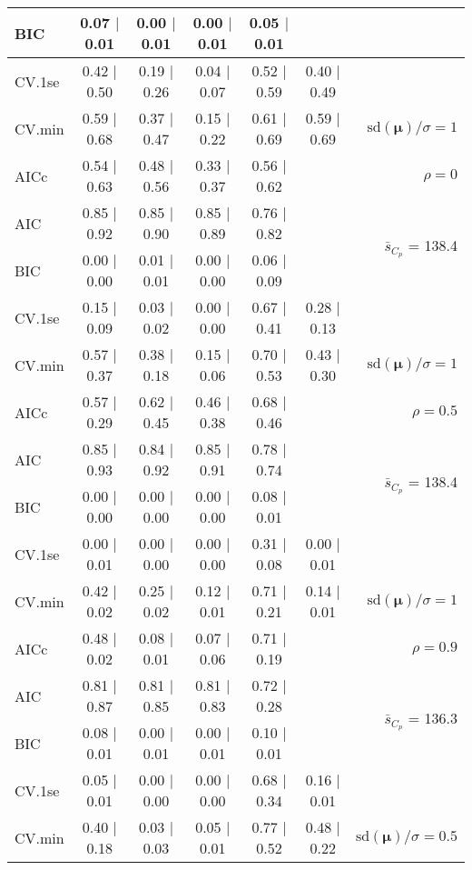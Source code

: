 \documentclass[12pt]{article}
\newcommand{\mr}[1]{\mathrm{#1}}
\newcommand{\bm}[1]{\mathbf{#1}}
\begin{document}
\begin{table}[p]
\begin{center}
\begin{tabular}{l*{5}{c}|r}
BIC & 0.07 $\mid$ 0.01 & 0.00 $\mid$ 0.01 & 0.00 $\mid$ 0.01 & 0.05 $\mid$ 0.01 & & \\
 \hline 
CV.1se & 0.42 $\mid$ 0.50 & 0.19 $\mid$ 0.26 & 0.04 $\mid$ 0.07 & 0.52 $\mid$ 0.59 & 0.40 $\mid$ 0.49 &\\
CV.min & 0.59 $\mid$ 0.68 & 0.37 $\mid$ 0.47 & 0.15 $\mid$ 0.22 & 0.61 $\mid$ 0.69 & 0.59 $\mid$ 0.69 &  $\mr{sd}(\bm{\mu})/\sigma=1$ \\
AICc & 0.54 $\mid$ 0.63 & 0.48 $\mid$ 0.56 & 0.33 $\mid$ 0.37 & 0.56 $\mid$ 0.62 & & $\rho=0$ \\
AIC & 0.85 $\mid$ 0.92 & 0.85 $\mid$ 0.90 & 0.85 $\mid$ 0.89 & 0.76 $\mid$ 0.82 & & \multirow{2}{*}{$\bar{s}_{C_p}$ = 138.4} \\
BIC & 0.00 $\mid$ 0.00 & 0.01 $\mid$ 0.01 & 0.00 $\mid$ 0.00 & 0.06 $\mid$ 0.09 & & \\
 \hline 
CV.1se & 0.15 $\mid$ 0.09 & 0.03 $\mid$ 0.02 & 0.00 $\mid$ 0.00 & 0.67 $\mid$ 0.41 & 0.28 $\mid$ 0.13 &\\
CV.min & 0.57 $\mid$ 0.37 & 0.38 $\mid$ 0.18 & 0.15 $\mid$ 0.06 & 0.70 $\mid$ 0.53 & 0.43 $\mid$ 0.30 &  $\mr{sd}(\bm{\mu})/\sigma=1$ \\
AICc & 0.57 $\mid$ 0.29 & 0.62 $\mid$ 0.45 & 0.46 $\mid$ 0.38 & 0.68 $\mid$ 0.46 & & $\rho=0.5$ \\
AIC & 0.85 $\mid$ 0.93 & 0.84 $\mid$ 0.92 & 0.85 $\mid$ 0.91 & 0.78 $\mid$ 0.74 & & \multirow{2}{*}{$\bar{s}_{C_p}$ = 138.4} \\
BIC & 0.00 $\mid$ 0.00 & 0.00 $\mid$ 0.00 & 0.00 $\mid$ 0.00 & 0.08 $\mid$ 0.01 & & \\
 \hline 
CV.1se & 0.00 $\mid$ 0.01 & 0.00 $\mid$ 0.00 & 0.00 $\mid$ 0.00 & 0.31 $\mid$ 0.08 & 0.00 $\mid$ 0.01 &\\
CV.min & 0.42 $\mid$ 0.02 & 0.25 $\mid$ 0.02 & 0.12 $\mid$ 0.01 & 0.71 $\mid$ 0.21 & 0.14 $\mid$ 0.01 &  $\mr{sd}(\bm{\mu})/\sigma=1$ \\
AICc & 0.48 $\mid$ 0.02 & 0.08 $\mid$ 0.01 & 0.07 $\mid$ 0.06 & 0.71 $\mid$ 0.19 & & $\rho=0.9$ \\
AIC & 0.81 $\mid$ 0.87 & 0.81 $\mid$ 0.85 & 0.81 $\mid$ 0.83 & 0.72 $\mid$ 0.28 & & \multirow{2}{*}{$\bar{s}_{C_p}$ = 136.3} \\
BIC & 0.08 $\mid$ 0.01 & 0.00 $\mid$ 0.01 & 0.00 $\mid$ 0.01 & 0.10 $\mid$ 0.01 & & \\
 \hline 
CV.1se & 0.05 $\mid$ 0.01 & 0.00 $\mid$ 0.00 & 0.00 $\mid$ 0.00 & 0.68 $\mid$ 0.34 & 0.16 $\mid$ 0.01 &\\
CV.min & 0.40 $\mid$ 0.18 & 0.03 $\mid$ 0.03 & 0.05 $\mid$ 0.01 & 0.77 $\mid$ 0.52 & 0.48 $\mid$ 0.22 &  $\mr{sd}(\bm{\mu})/\sigma=0.5$ \\

\end{tabular}
\end{center}
\end{table}
\end{document}
